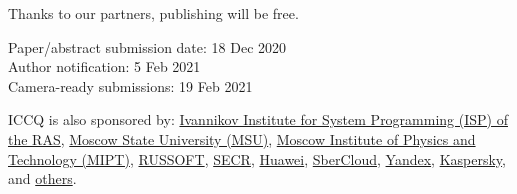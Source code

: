\documentclass{../cfp}
\begin{document}
Thanks to our partners, publishing will be free.

\vspace{6pt}

Paper/abstract submission date: 18 Dec 2020 \\
Author notification: 5 Feb 2021 \\
Camera-ready submissions: 19 Feb 2021

\vspace{6pt}

\begin{adjustwidth}{0pt}{1.5in}
ICCQ is also sponsored by:
\href{https://www.ispras.ru/en/}{Ivannikov Institute for System Programming (ISP) of the RAS},
\href{https://www.msu.ru/}{Moscow State University (MSU)},
\href{https://mipt.ru/english/}{Moscow Institute of Physics and Technology (MIPT)},
\href{https://russoft.org/en/}{RUSSOFT},
\href{https://2021.secrus.org/?lang=en}{SECR},
\href{https://www.huawei.com}{Huawei},
\href{https://sbercloud.ru/}{SberCloud},
\href{https://yandex.ru/}{Yandex},
\href{https://www.kaspersky.com/}{Kaspersky},
and \href{https://www.iccq.ru/#partners}{others}.
\end{adjustwidth}
\end{document}
